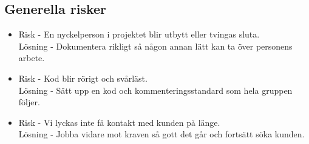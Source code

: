 \subsection{Generella risker}
\begin{itemize}
\item Risk - En nyckelperson i projektet blir utbytt eller tvingas sluta.
\\Lösning - Dokumentera rikligt så någon annan lätt kan ta över personens arbete.
\item Risk - Kod blir rörigt och svårläst.
\\Lösning - Sätt upp en kod och kommenteringsstandard som hela gruppen följer.
\item Risk - Vi lyckas inte få kontakt med kunden på länge.
\\Lösning - Jobba vidare mot kraven så gott det går och fortsätt söka kunden.
\end{itemize}



